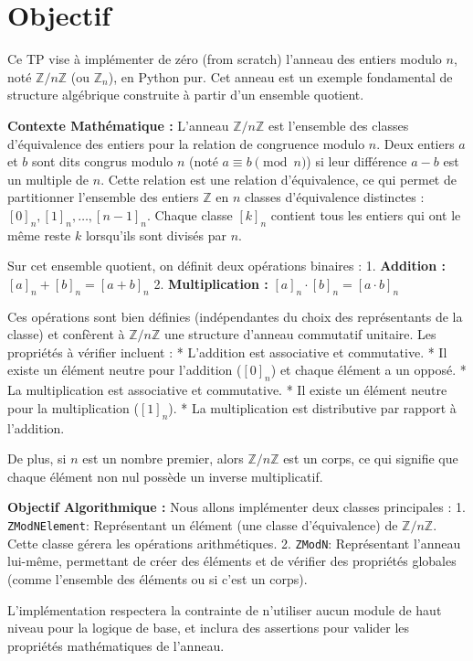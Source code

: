 \documentclass{report}
\begin{document}
\section*{Objectif}
Ce TP vise à implémenter de zéro (from scratch) l'anneau des entiers modulo $n$, noté $\mathbb{Z}/n\mathbb{Z}$ (ou $\mathbb{Z}_n$), en Python pur. Cet anneau est un exemple fondamental de structure algébrique construite à partir d'un ensemble quotient.

\textbf{Contexte Mathématique :}
L'anneau $\mathbb{Z}/n\mathbb{Z}$ est l'ensemble des classes d'équivalence des entiers pour la relation de congruence modulo $n$. Deux entiers $a$ et $b$ sont dits congrus modulo $n$ (noté $a \equiv b \pmod n$) si leur différence $a-b$ est un multiple de $n$. Cette relation est une relation d'équivalence, ce qui permet de partitionner l'ensemble des entiers $\mathbb{Z}$ en $n$ classes d'équivalence distinctes : $[0]_n, [1]_n, \dots, [n-1]_n$. Chaque classe $[k]_n$ contient tous les entiers qui ont le même reste $k$ lorsqu'ils sont divisés par $n$.

Sur cet ensemble quotient, on définit deux opérations binaires :
1.  \textbf{Addition :} $[a]_n + [b]_n = [a+b]_n$
2.  \textbf{Multiplication :} $[a]_n \cdot [b]_n = [a \cdot b]_n$

Ces opérations sont bien définies (indépendantes du choix des représentants de la classe) et confèrent à $\mathbb{Z}/n\mathbb{Z}$ une structure d'anneau commutatif unitaire. Les propriétés à vérifier incluent :
*   L'addition est associative et commutative.
*   Il existe un élément neutre pour l'addition ($[0]_n$) et chaque élément a un opposé.
*   La multiplication est associative et commutative.
*   Il existe un élément neutre pour la multiplication ($[1]_n$).
*   La multiplication est distributive par rapport à l'addition.

De plus, si $n$ est un nombre premier, alors $\mathbb{Z}/n\mathbb{Z}$ est un corps, ce qui signifie que chaque élément non nul possède un inverse multiplicatif.

\textbf{Objectif Algorithmique :}
Nous allons implémenter deux classes principales :
1.  \texttt{ZModNElement}: Représentant un élément (une classe d'équivalence) de $\mathbb{Z}/n\mathbb{Z}$. Cette classe gérera les opérations arithmétiques.
2.  \texttt{ZModN}: Représentant l'anneau lui-même, permettant de créer des éléments et de vérifier des propriétés globales (comme l'ensemble des éléments ou si c'est un corps).

L'implémentation respectera la contrainte de n'utiliser aucun module de haut niveau pour la logique de base, et inclura des assertions pour valider les propriétés mathématiques de l'anneau.
\end{document}
